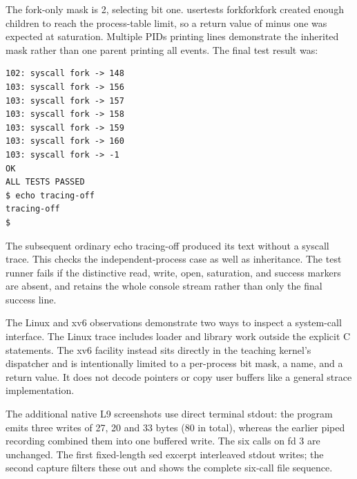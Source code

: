 \documentclass[12pt,a4paper]{article}
\makeatletter
\renewcommand\subsection{\@startsection{subsection}{2}{0pt}{12pt}{5pt}{\normalfont\large\bfseries}}
\makeatother
\begin{document}
The fork-only mask is 2, selecting bit one.
{\ttfamily\fontsize{10}{12}\selectfont usertests forkforkfork} created
enough children to reach the process-table limit, so a return value of
minus one was expected at saturation. Multiple PIDs printing lines
demonstrate the inherited mask rather than one parent printing all
events. The final test result was:

\par\noindent\begin{minipage}{\linewidth}

\begin{lstlisting}
102: syscall fork -> 148
103: syscall fork -> 156
103: syscall fork -> 157
103: syscall fork -> 158
103: syscall fork -> 159
103: syscall fork -> 160
103: syscall fork -> -1
OK
ALL TESTS PASSED
$ echo tracing-off
tracing-off
$
\end{lstlisting}

\end{minipage}\par

The subsequent ordinary
{\ttfamily\fontsize{10}{12}\selectfont echo tracing-off} produced its
text without a syscall trace. This checks the independent-process case
as well as inheritance. The test runner fails if the distinctive read,
write, open, saturation, and success markers are absent, and retains the
whole console stream rather than only the final success line.

\subsection{Limits and conclusion}\label{limits-and-conclusion}

The Linux and xv6 observations demonstrate two ways to inspect a
system-call interface. The Linux trace includes loader and library work
outside the explicit C statements. The xv6 facility instead sits
directly in the teaching kernel's dispatcher and is intentionally
limited to a per-process bit mask, a name, and a return value. It does
not decode pointers or copy user buffers like a general strace
implementation.

The additional native L9 screenshots use direct terminal stdout: the
program emits three writes of 27, 20 and 33 bytes (80 in total), whereas
the earlier piped recording combined them into one buffered write. The
six calls on fd 3 are unchanged. The first fixed-length sed excerpt
interleaved stdout writes; the second capture filters these out and
shows the complete six-call file sequence.
\end{document}
